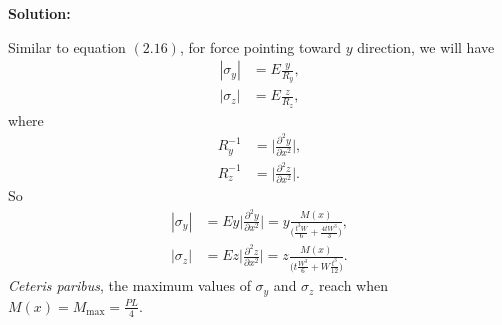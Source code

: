 \documentclass[12pt]{article}
\begin{document}
\begin{enumerate}[(a)]
	      \textbf{Solution:}

	      Similar to equation $(2.16)$, for force pointing toward $y$ direction, we will have
	      \begin{align}
		      | \sigma_y | & = E \frac{ y }{ R_y }, \\
		      | \sigma_z | & = E \frac{ z }{ R_z },
	      \end{align}
	      where
	      \begin{align}
		      R_y^{-1} & = \bigg| \frac{ \partial^2 y }{ \partial x^2 } \bigg|, \\
		      R_z^{-1} & = \bigg| \frac{ \partial^2 z }{ \partial  x^2} \bigg|.
	      \end{align}
	      So
	      \begin{align}
		      | \sigma_y | & = E y \bigg| \frac{ \partial^2 y }{ \partial x^2 } \bigg| = y \frac{ M(x) }{ \big( \frac{t^3 W}{6} + \frac{4 t W^3}{3} \big)},        \\
		      | \sigma_z | & = E z \bigg| \frac{ \partial^2 z }{ \partial  x^2} \bigg| = z \frac{ M(x) }{ \big( t \frac{ W^3 }{ 6 } + W \frac{ t^3 }{ 12 } \big)}.
	      \end{align}
	      \emph{Ceteris paribus},
	      the maximum values of $\sigma_y$ and $\sigma_z$ reach when $M(x) = M_\text{max} = \frac{ P L }{ 4 }$.
\end{enumerate}

% 
% 

\end{document}
